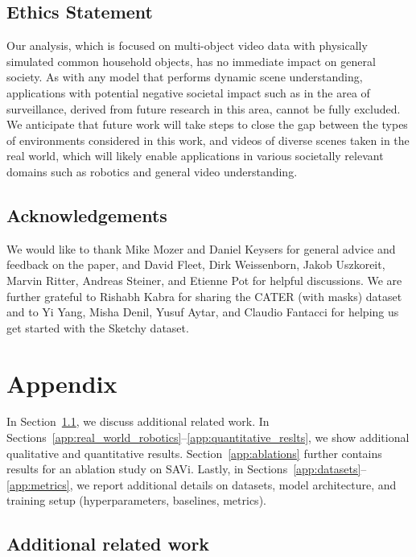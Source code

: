 \documentclass{article}
\begin{document}
\subsection*{Ethics Statement}
Our analysis, which is focused on multi-object video data with physically simulated common household objects, has no immediate impact on general society. As with any model that performs dynamic scene understanding, applications with potential negative societal impact such as in the area of surveillance, derived from future research in this area, cannot be fully excluded. We anticipate that future work will take steps to close the gap between the types of environments considered in this work, and videos of diverse scenes taken in the real world, which will likely enable applications in various societally relevant domains such as robotics and general video understanding. 

\subsection*{Acknowledgements}
We would like to thank Mike Mozer and Daniel Keysers for general advice and feedback on the paper, and David Fleet, Dirk Weissenborn, Jakob Uszkoreit, Marvin Ritter, Andreas Steiner, and Etienne Pot for helpful discussions. We are further grateful to Rishabh Kabra for sharing the CATER (with masks) dataset and to Yi Yang, Misha Denil, Yusuf Aytar, and Claudio Fantacci for helping us get started with the Sketchy dataset.




\newpage
\appendix
\section{Appendix}

\setcounter{figure}{0} \renewcommand{\thefigure}{A.\arabic{figure}}
\setcounter{table}{0} \renewcommand{\thetable}{A.\arabic{table}}

In Section~\ref{app:related_work}, we discuss additional related work. In Sections~\ref{app:real_world_robotics}--\ref{app:quantitative_reslts}, we show additional qualitative and quantitative results. Section~\ref{app:ablations} further contains results for an ablation study on SAVi. Lastly, in Sections~\ref{app:datasets}--\ref{app:metrics}, we report additional details on datasets, model architecture, and training setup (hyperparameters, baselines, metrics).


\subsection{Additional related work}
\label{app:related_work}
\end{document}
